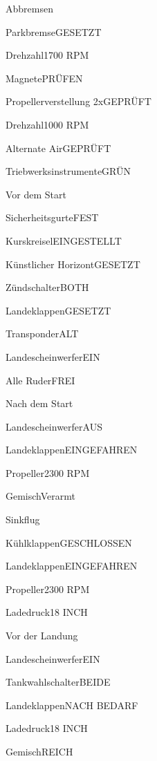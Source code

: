   \begin{checklist}{Abbremsen}
    \item{Parkbremse}{GESETZT}
    \item{Drehzahl}{1700 RPM}
    \item{Magnete}{PRÜFEN}
    \item{Propellerverstellung 2x}{GEPRÜFT}
    \item{Drehzahl}{1000 RPM}
    \item{Alternate Air}{GEPRÜFT}
    \item{Triebwerksinstrumente}{GRÜN}
  \end{checklist}

  \begin{checklist}{Vor dem Start}
    \item{Sicherheitsgurte}{FEST}
    \item{Kurskreisel}{EINGESTELLT}
    \item{Künstlicher Horizont}{GESETZT}
    \item{Zündschalter}{BOTH}
    \item{Landeklappen}{GESETZT}
    \item{Transponder}{ALT}
    \item{Landescheinwerfer}{EIN}
    \item{Alle Ruder}{FREI}
  \end{checklist}

  \begin{checklist}{Nach dem Start}
    \item{Landescheinwerfer}{AUS}
    \item{Landeklappen}{EINGEFAHREN}
    \item{Propeller}{2300 RPM}
    \item{Gemisch}{Verarmt}
  \end{checklist}

  \begin{checklist}{Sinkflug}
    \item{Kühlklappen}{GESCHLOSSEN}
    \item{Landeklappen}{EINGEFAHREN}
    \item{Propeller}{2300 RPM}
    \item{Ladedruck}{18 INCH}
  \end{checklist}

  \begin{checklist}{Vor der Landung}
    \item{Landescheinwerfer}{EIN}
    \item{Tankwahlschalter}{BEIDE}
    \item{Landeklappen}{NACH BEDARF}
    \item{Ladedruck}{18 INCH}
    \item{Gemisch}{REICH}
  \end{checklist}

